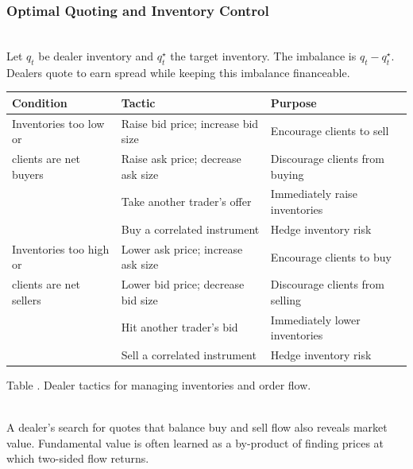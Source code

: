 \subsubsection{Optimal Quoting and Inventory Control}

\begin{definition} \\
Let $q_t$ be dealer inventory and $q_t^\star$ the target inventory. The imbalance is $q_t-q_t^\star$. Dealers quote to earn spread while keeping this imbalance financeable.
\end{definition}

\begin{table}[htbp]
\centering
\scriptsize
{}
\renewcommand{\arraystretch}{1.13}
\setlength{\tabcolsep}{4pt}
\begin{tabularx}{\textwidth}{@{}>{\RaggedRight\arraybackslash}p{} >{\RaggedRight\arraybackslash}p{} >{\RaggedRight\arraybackslash}X@{}}
\hline
\textbf{Condition} & \textbf{Tactic} & \textbf{Purpose} \\
\hline
Inventories too low or & Raise bid price; increase bid size & Encourage clients to sell \\
clients are net buyers & Raise ask price; decrease ask size & Discourage clients from buying \\
& Take another trader's offer & Immediately raise inventories \\
& Buy a correlated instrument & Hedge inventory risk \\
\hline
Inventories too high or & Lower ask price; increase ask size & Encourage clients to buy \\
clients are net sellers & Lower bid price; decrease bid size & Discourage clients from selling \\
& Hit another trader's bid & Immediately lower inventories \\
& Sell a correlated instrument & Hedge inventory risk \\
\hline
\end{tabularx}

\vspace{0.25em}
{\footnotesize Table \thetable. Dealer tactics for managing inventories and order flow.}
\end{table}

\begin{principle} \\
A dealer's search for quotes that balance buy and sell flow also reveals market value. Fundamental value is often learned as a by-product of finding prices at which two-sided flow returns.
\end{principle}

